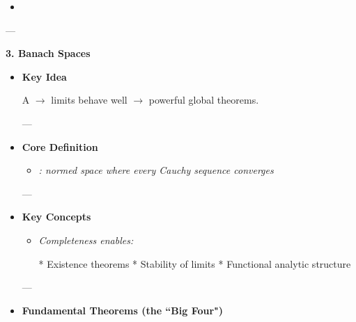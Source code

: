 \documentclass[12pt,a4paper]{report}
\begin{document}
\begin{description}
\begin{itemize}
\begin{itemize}
            \item \textit{}
            \end{itemize}

    \end{itemize}
---

\item \textbf{3. Banach Spaces}

    \begin{itemize}
    \item \textbf{Key Idea}

A  $\to$ limits behave well $\to$ powerful global theorems.

---

    \item \textbf{Core Definition}

            \begin{itemize}
            \item \textit{: normed space where every Cauchy sequence converges}

            \end{itemize}
---

    \item \textbf{Key Concepts}

            \begin{itemize}
            \item \textit{Completeness enables:}

  * Existence theorems
  * Stability of limits
  * Functional analytic structure

            \end{itemize}
---

    \item \textbf{Fundamental Theorems (the ``Big Four")}

\end{itemize}
\end{description}
\end{document}
